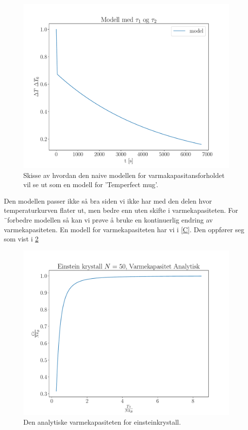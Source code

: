 \documentclass[ reprint, amsmath,amssymb, aps]{revtex4-2}
\begin{document}
\begin{figure}
\centering
\includegraphics[scale=0.35]{2tauplot.pdf}
\caption{Skisse av hvordan den naive modellen for varmakapasitansforholdet vil se ut som en modell for 'Temperfect mug'.}
\label{plot2tauRep}
\end{figure}

Den modellen passer ikke så bra siden vi ikke har med den delen hvor temperaturkurven flater ut, men bedre enn uten skifte i varmekapasiteten. For ¨forbedre modellen så kan vi prøve å bruke en kontinuerlig endring av varmekapasiteten. En modell for varmekapasiteten har vi i \ref{C}. Den oppfører seg som vist i \ref{VanalytiskRep}

\begin{figure}
\centering
\includegraphics[scale=0.35]{Vanalytisk.pdf}
\caption{Den analytiske varmekapasiteten for einsteinkrystall.}
\label{VanalytiskRep}
\end{figure}
\end{document}
